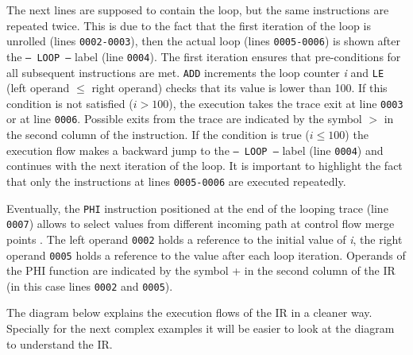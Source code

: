 The next lines are supposed to contain the loop, but the same instructions are repeated twice. This is due to the fact that the first iteration of the loop is unrolled (lines \texttt{0002-0003}), then the actual loop (lines \texttt{0005-0006}) is shown after the \texttt{-- LOOP --} label (line \texttt{0004}). The first iteration ensures that pre-conditions for all subsequent instructions are met. \texttt{ADD} increments the loop counter \textit{i} and \texttt{LE} (left operand $\leq$ right operand) checks that its value is lower than 100. If this condition is not satisfied ($i>100$), the execution takes the trace exit at line \texttt{0003} or at line \texttt{0006}. Possible exits from the trace are indicated by the symbol $>$ in the second column of the instruction. If the condition is true ($i\leq100$) the execution flow makes a backward jump to the \texttt{-- LOOP --} label (line \texttt{0004}) and continues with the next iteration of the loop. It is important to highlight the fact that only the instructions at lines \texttt{0005-0006} are executed repeatedly.

Eventually, the \texttt{PHI} instruction positioned at the end of the looping trace (line \texttt{0007}) allows to select values from different incoming path at control flow merge points \cite{SSA-form}. The left operand \texttt{0002} holds a reference to the initial value of \textit{i}, the right operand \texttt{0005} holds a reference to the value after each loop iteration. Operands of the PHI function are indicated by the symbol + in the second column of the IR (in this case lines \texttt{0002} and \texttt{0005}).

The diagram below explains the execution flows of the IR in a cleaner way. Specially for the next complex examples it will be easier to look at the diagram  to understand the IR.


